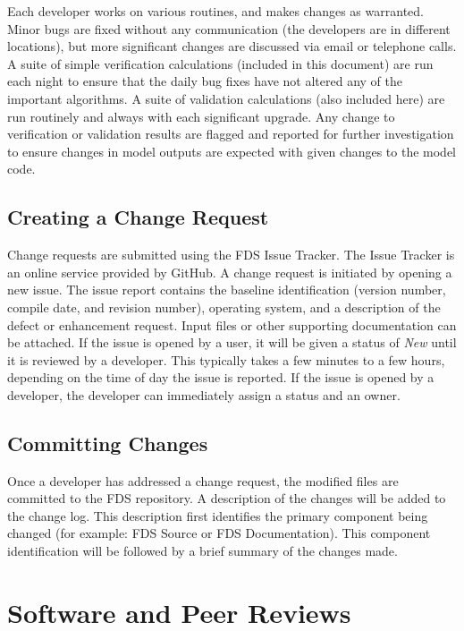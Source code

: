 \documentclass[11pt]{book}
\begin{document}
Each developer works on various routines, and makes changes as warranted. Minor bugs are fixed without any communication (the developers are in different locations), but more significant changes are discussed via email or telephone calls. A suite of simple verification calculations (included in this document) are run each night to ensure that the daily bug fixes have not altered any of the important algorithms. A suite of validation calculations (also included here) are run routinely and always with each significant upgrade. Any change to verification or validation results are flagged and reported for further investigation to ensure changes in model outputs are expected with given changes to the model code.


\subsection{Creating a Change Request}

Change requests are submitted using the FDS Issue Tracker.  The Issue Tracker is an online service provided by GitHub. A change request is initiated by opening a new issue.  The issue report contains the baseline identification (version number, compile date, and revision number), operating system, and a description of the defect or enhancement request.  Input files or other supporting documentation can be attached. If the issue is opened by a user, it will be given a status of {\em New} until it is reviewed by a developer. This typically takes a few minutes to a few hours, depending on the time of day the issue is reported. If the issue is opened by a developer, the developer can immediately assign a status and an owner.


\subsection{Committing Changes}

Once a developer has addressed a change request, the modified files are committed to the FDS repository.  A description of the changes will be added to the change log.  This description first identifies the primary component being changed (for example: FDS Source or FDS Documentation).  This component identification will be followed by a brief summary of the changes made.



\section{Software and Peer Reviews}
\end{document}

